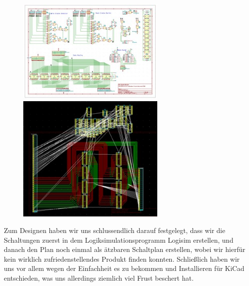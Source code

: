 \documentclass{scrartcl}
\begin{document}
        \begin{figure}
        \vspace{-20pt}
        \begin{center}
        \includegraphics[width=0.65\textwidth]{kicad_schematic}
        \includegraphics[width=0.65\textwidth]{kicad_pcb}
        \end{center}
        \vspace{-20pt}
        \end{figure}
    Zum Designen haben wir uns schlussendlich darauf festgelegt, dass wir die Schaltungen zuerst in dem Logiksimulationsprogramm Logisim erstellen,
    und danach den Plan noch einmal als ätzbaren Schaltplan erstellen, wobei wir hierfür kein wirklich zufriedenstellendes Produkt finden konnten.
    Schließlich haben wir uns vor allem wegen der Einfachheit es zu bekommen und Installieren für KiCad entschieden, was uns allerdings ziemlich viel Frust beschert hat.
\end{document}
